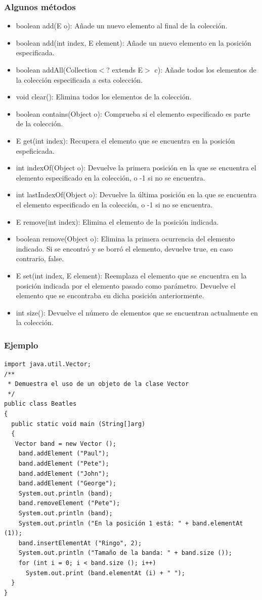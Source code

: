 \documentclass{beamer}
\begin{document}
\begin{frame}
\frametitle{Algunos métodos}
\begin{scriptsize}
\begin{itemize}[<+->]
\item boolean add(E o): Añade un nuevo elemento al final de la colección.
\item boolean add(int index, E element): Añade un nuevo elemento en la posición especificada.
\item boolean addAll(Collection$<$? extends E$>$ c): Añade todos los elementos de la colección especificada a esta colección.
\item void clear(): Elimina todos los elementos de la colección.
\item boolean contains(Object o): Comprueba si el elemento especificado es parte de la colección.
\item E get(int index): Recupera el elemento que se encuentra en la posición espeficicada.
\item int indexOf(Object o): Devuelve la primera posición en la que se encuentra el elemento especificado en la colección, o -1 si no se encuentra.
\item int lastIndexOf(Object o): Devuelve la última posición en la que se encuentra el elemento especificado en la colección, o -1 si no se encuentra.
\item E remove(int index): Elimina el elemento de la posición indicada.
\item boolean remove(Object o): Elimina la primera ocurrencia del elemento indicado. Si se encontró y se borró el elemento, devuelve true, en caso contrario, false.
\item E set(int index, E element): Reemplaza el elemento que se encuentra en la posición indicada por el elemento pasado como parámetro. Devuelve el elemento que se encontraba en dicha posición anteriormente.
\item int size(): Devuelve el número de elementos que se encuentran actualmente en la colección.
\end{itemize}
\end{scriptsize}
\end{frame}

\begin{frame}[fragile]
\frametitle{Ejemplo}
\begin{scriptsize}
\begin{verbatim}
import java.util.Vector;
/**
 * Demuestra el uso de un objeto de la clase Vector
 */
public class Beatles
{
  public static void main (String[]arg)
  {
   Vector band = new Vector ();
    band.addElement ("Paul");
    band.addElement ("Pete");
    band.addElement ("John");
    band.addElement ("George");
    System.out.println (band);
    band.removeElement ("Pete");
    System.out.println (band);
    System.out.println ("En la posición 1 está: " + band.elementAt (1));
    band.insertElementAt ("Ringo", 2);
    System.out.println ("Tamaño de la banda: " + band.size ());
    for (int i = 0; i < band.size (); i++)
      System.out.print (band.elementAt (i) + " ");
  }
}
\end{verbatim}
\end{scriptsize}
\end{frame}
\end{document}
